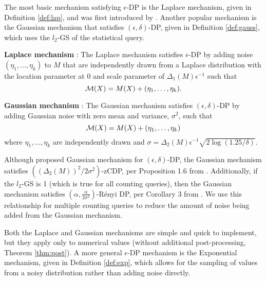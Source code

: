 The most basic mechanism satisfying $\epsilon$-DP is the Laplace mechanism, given in Definition \ref{def:lap}, and was first introduced by \cite{dwork2006calibrating}. Another popular mechanism is the Gaussian mechanism that satisfies $(\epsilon, \delta)$-DP, given in Definition \ref{def:gauss}, which uses the $l_2$-GS of the statistical query.
\begin{defn}\textbf{Laplace mechanism} \citep{dwork2006calibrating}: \label{def:lap}
The Laplace mechanism satisfies $\epsilon$-DP by adding noise  $(\eta_1,\ldots,\eta_k)$ to $M$ that are independently drawn from a Laplace distribution with the location parameter at 0 and scale parameter of $\Delta_1(M)\epsilon^{-1}$ such that 
    \begin{equation}\label{eqn:lap}
        \mathcal{M}(X)=M(X)+(\eta_1,\ldots,\eta_k).
    \end{equation}
\end{defn}
\vspace{-8pt}
\begin{defn}\label{def:gauss} \textbf{Gaussian mechanism} \citep{dwork2014algorithmic}:
    The Gaussian mechanism satisfies $(\epsilon,\delta)$-DP by adding Gaussian noise with zero mean and variance, $\sigma^2$, such that
        \begin{equation}\label{eqn:gauss}
            \mathcal{M}(X)=M(X)+(\eta_1,\ldots,\eta_k)
        \end{equation}
    where $\eta_1,\ldots,\eta_k$ are independently drawn and $\sigma=\Delta_2(M)\epsilon^{-1} \sqrt{2 \log(1.25/\delta)}$. 
\end{defn}
\vspace{-8pt}
Although \cite{dwork2014algorithmic} proposed Gaussian mechanism for $(\epsilon,\delta)$-DP, the Gaussian mechanism satisfies $((\Delta_2(M))^2/2\sigma^2)$-zCDP, per Proposition 1.6 from \cite{bun2016concentrated}. Additionally, if the $l_2$-GS is 1 (which is true for all counting queries), then the Gaussian mechanism satisfies $\left(\alpha, \frac{\alpha}{2\sigma^2}\right)$-R\'enyi DP, per Corollary 3 from  \cite{mironov2017renyi}. We use this relationship for multiple counting queries to reduce the amount of noise being added from the Gaussian mechanism. 

Both the Laplace and Gaussian mechanisms are simple and quick to implement, but they apply only to numerical values (without additional post-processing, Theorem \ref{thm:post}). A more general $\epsilon$-DP mechanism is the Exponential mechanism, given in Definition \ref{def:exp}, which allows for the sampling of values from a noisy distribution rather than adding noise directly. 

